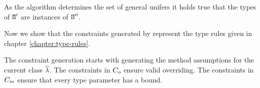 As the \unify{} algorithm determines the set of general unifers it
  holds true that the types of ${\tt \Pi}'$ are
  instances of ${\tt \Pi}''$.

Now we show that the constraints generated by {\fjtype{}}
represent the type rules given in chapter \ref{chapter:type-rules}.




The constraint generation starts with generating the method assumptions for the current class $\overline{\mathtt{\lambda}}$.
The constraints in $C_o$ ensure valid overriding.
The constraints in $C_m$ ensure that every type parameter has a bound.

